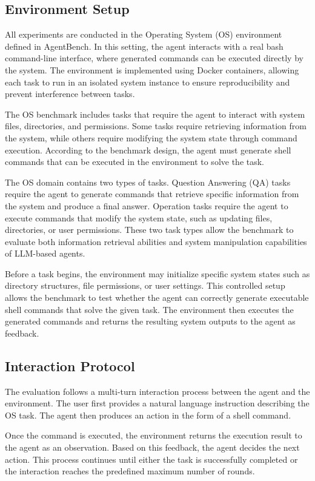 \documentclass[11pt]{article}
\begin{document}
\subsection{Environment Setup}

All experiments are conducted in the Operating System (OS) environment defined in AgentBench. In this setting, the agent interacts with a real bash command-line interface, where generated commands can be executed directly by the system. The environment is implemented using Docker containers, allowing each task to run in an isolated system instance to ensure reproducibility and prevent interference between tasks.

The OS benchmark includes tasks that require the agent to interact with system files, directories, and permissions. Some tasks require retrieving information from the system, while others require modifying the system state through command execution. According to the benchmark design, the agent must generate shell commands that can be executed in the environment to solve the task.

The OS domain contains two types of tasks.
Question Answering (QA) tasks require the agent to generate commands that retrieve specific information from the system and produce a final answer.
Operation tasks require the agent to execute commands that modify the system state, such as updating files, directories, or user permissions. These two task types allow the benchmark to evaluate both information retrieval abilities and system manipulation capabilities of LLM-based agents.

Before a task begins, the environment may initialize specific system states such as directory structures, file permissions, or user settings. This controlled setup allows the benchmark to test whether the agent can correctly generate executable shell commands that solve the given task. The environment then executes the generated commands and returns the resulting system outputs to the agent as feedback.

\subsection{Interaction Protocol}

The evaluation follows a multi-turn interaction process between the agent and the environment. The user first provides a natural language instruction describing the OS task. The agent then produces an action in the form of a shell command.

Once the command is executed, the environment returns the execution result to the agent as an observation. Based on this feedback, the agent decides the next action. This process continues until either the task is successfully completed or the interaction reaches the predefined maximum number of rounds.
\end{document}
